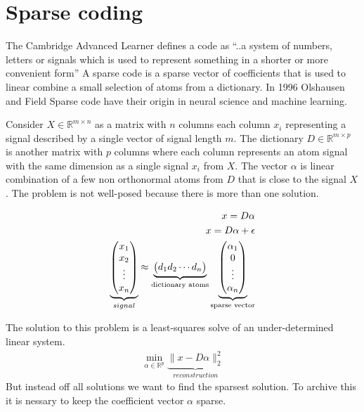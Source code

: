 \chapter{Sparse coding}
\label{chap:sparse_coding}

The Cambridge Advanced Learner defines a code as ``..a system of numbers,
letters or signals which is used to represent something in a shorter or more
convenient form'' A sparse code is a sparse vector of coefficients that is used
to linear combine a small selection of atoms from a dictionary. In 
1996 Olshausen and Field\cite{Olshausen1996} Sparse code have
their origin in neural science and machine learning.


Consider $X \in \mathbb{R}^{m\times n}$  as a matrix with $n$ columns each
column $x_{i}$ representing a signal described by a single vector of
signal length $m$. The dictionary $D\in\mathbb{R}^{m \times p}$ is another
matrix with $p$ columns where each column represents an atom signal with the
same dimension as a single signal $x_{i}$ from $X$. The vector $\alpha$ is
linear combination of a few non orthonormal atoms from $D$ that is close to the
signal $X$. The problem is not well-posed because there is more than one
solution. 

\begin{align}
x = D\alpha \notag\\
x = D\alpha+\epsilon \notag\\
\underbrace{\begin{pmatrix} x_1 \\ x_2 \\ \vdots \\ x_n \end{pmatrix}}_{signal} \approx \underbrace{\begin{pmatrix} d_1  d_2 \cdots d_n \end{pmatrix}}_{\textrm{dictionary atoms}}
\underbrace{\begin{pmatrix} \alpha_1 \\ 0 \\ \vdots \\ \alpha_n \end{pmatrix}}_{\textrm{sparse vector}}
\end{align}

The solution to this problem is a least-squares solve of an under-determined
linear system. 
\begin{align}
\min_{\alpha\in\mathbb{R}^{p}} \underbrace{\lVert x - D\alpha \rVert^{2}_{2}}_{reconstruction} \label{eq:problem}
\end{align}
But instead off all solutions we want to find the sparsest solution. 
To archive this it is nessary to keep the coefficient vector $\alpha$ sparse.
